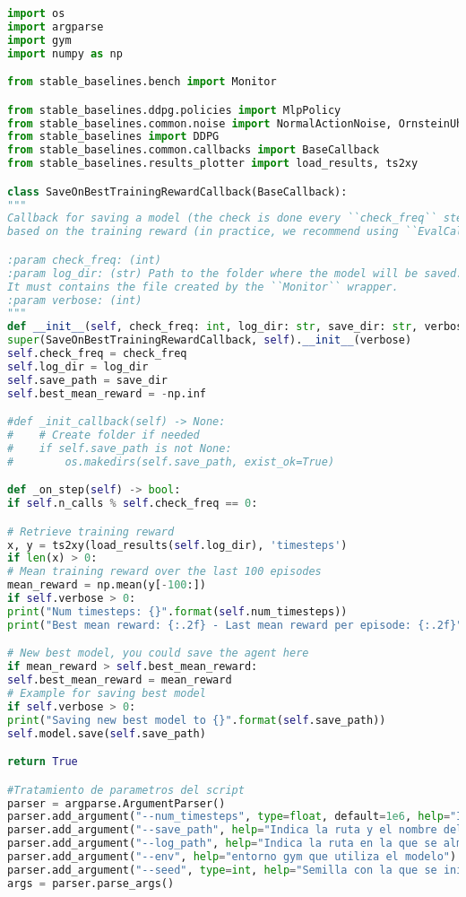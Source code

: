 \documentclass[11pt,fleqn]{book} %
\begin{document}
\begin{lstlisting}[language=python]
import os
import argparse
import gym
import numpy as np

from stable_baselines.bench import Monitor

from stable_baselines.ddpg.policies import MlpPolicy
from stable_baselines.common.noise import NormalActionNoise, OrnsteinUhlenbeckActionNoise, AdaptiveParamNoiseSpec
from stable_baselines import DDPG
from stable_baselines.common.callbacks import BaseCallback
from stable_baselines.results_plotter import load_results, ts2xy

class SaveOnBestTrainingRewardCallback(BaseCallback):
"""
Callback for saving a model (the check is done every ``check_freq`` steps)
based on the training reward (in practice, we recommend using ``EvalCallback``).

:param check_freq: (int)
:param log_dir: (str) Path to the folder where the model will be saved.
It must contains the file created by the ``Monitor`` wrapper.
:param verbose: (int)
"""
def __init__(self, check_freq: int, log_dir: str, save_dir: str, verbose=1):
super(SaveOnBestTrainingRewardCallback, self).__init__(verbose)
self.check_freq = check_freq
self.log_dir = log_dir
self.save_path = save_dir
self.best_mean_reward = -np.inf

#def _init_callback(self) -> None:
#    # Create folder if needed
#    if self.save_path is not None:
#        os.makedirs(self.save_path, exist_ok=True)

def _on_step(self) -> bool:
if self.n_calls % self.check_freq == 0:

# Retrieve training reward
x, y = ts2xy(load_results(self.log_dir), 'timesteps')
if len(x) > 0:
# Mean training reward over the last 100 episodes
mean_reward = np.mean(y[-100:])
if self.verbose > 0:
print("Num timesteps: {}".format(self.num_timesteps))
print("Best mean reward: {:.2f} - Last mean reward per episode: {:.2f}".format(self.best_mean_reward, mean_reward))

# New best model, you could save the agent here
if mean_reward > self.best_mean_reward:
self.best_mean_reward = mean_reward
# Example for saving best model
if self.verbose > 0:
print("Saving new best model to {}".format(self.save_path))
self.model.save(self.save_path)

return True

#Tratamiento de parametros del script
parser = argparse.ArgumentParser()
parser.add_argument("--num_timesteps", type=float, default=1e6, help="Indica el numero de timesteps que va a tener el entrenamiento, por defecto 1e6")
parser.add_argument("--save_path", help="Indica la ruta y el nombre del archivo en el que se va a almacenar el modelo.pkl")
parser.add_argument("--log_path", help="Indica la ruta en la que se almacena los logs del proceso de aprendizaje")
parser.add_argument("--env", help="entorno gym que utiliza el modelo")
parser.add_argument("--seed", type=int, help="Semilla con la que se inicia el entrenamiento del modelo")
args = parser.parse_args()


\end{lstlisting}
\end{document}
